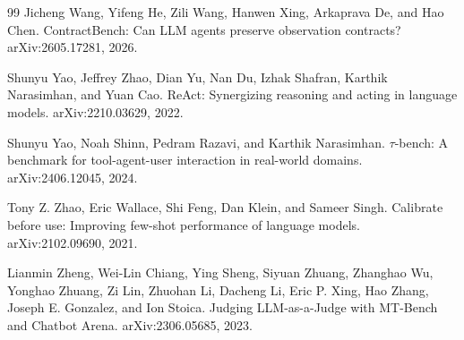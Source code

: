 \begin{thebibliography}{99}
 Jicheng Wang, Yifeng He, Zili Wang,
Hanwen Xing, Arkaprava De, and Hao Chen.
\newblock ContractBench: Can LLM agents preserve observation contracts?
\newblock arXiv:2605.17281, 2026.

 Shunyu Yao, Jeffrey Zhao, Dian Yu,
Nan Du, Izhak Shafran, Karthik Narasimhan, and Yuan Cao.
\newblock ReAct: Synergizing reasoning and acting in language models.
\newblock arXiv:2210.03629, 2022.

 Shunyu Yao, Noah Shinn, Pedram Razavi,
and Karthik Narasimhan.
\newblock $\tau$-bench: A benchmark for tool-agent-user interaction in
real-world domains.
\newblock arXiv:2406.12045, 2024.

 Tony Z. Zhao, Eric Wallace, Shi Feng,
Dan Klein, and Sameer Singh.
\newblock Calibrate before use: Improving few-shot performance of language
models.
\newblock arXiv:2102.09690, 2021.

 Lianmin Zheng, Wei-Lin Chiang,
Ying Sheng, Siyuan Zhuang, Zhanghao Wu, Yonghao Zhuang, Zi Lin,
Zhuohan Li, Dacheng Li, Eric P. Xing, Hao Zhang, Joseph E. Gonzalez,
and Ion Stoica.
\newblock Judging LLM-as-a-Judge with MT-Bench and Chatbot Arena.
\newblock arXiv:2306.05685, 2023.
\end{thebibliography}
